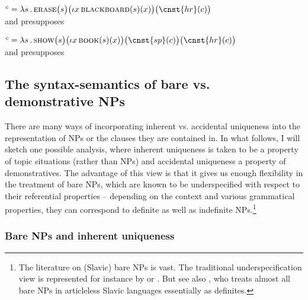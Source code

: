 \documentclass[output=paper,colorlinks,citecolor=brown,newtxmath]{langscibook}
\begin{document}
\ea {}$^c=\lambda s\,.\,\textsc{erase}\big(s\big)\big(\iota x\,\textsc{blackboard}(s)(x)\big)\big(\cnst{hr}(c)\big)$\\
and presupposes   \label{simik:ex:blackboard-tc}
\z

\ea {}$^c=\lambda s\,.\,\textsc{show}\big(s\big)\big(\iota x\,\textsc{book}(s)(x)\big)\big(\cnst{sp}(c)\big)\big(\cnst{hr}(c)\big)$\\\label{simik:ex:kramsky-tc}
and presupposes 
\z



\subsection{The syntax-semantics of bare vs. demonstrative NPs}

There are many ways of incorporating inherent vs. accidental uniqueness into the representation of NPs or the clauses they are contained in. In what follows, I will sketch one possible analysis, where inherent uniqueness is taken to be a property of topic situations (rather than NPs) and accidental uniqueness a property of demonstratives. The advantage of this view is that it gives us enough flexibility in the treatment of bare NPs, which are known to be underspecified with respect to their referential properties -- depending on the context and various grammatical properties, they can correspond to definite as well as indefinite NPs.\footnote{The literature on (Slavic) bare NPs is vast. The traditional underspecification view is represented for instance by \citet{Chierchia1998} or \citet{Geist2010}. But see also \citet{Dayal2004,Dayal2011}, who treats almost all bare NPs in articleless Slavic languages essentially as definites.}

\subsubsection{Bare NPs and inherent uniqueness}\label{simik:sec:bare-nps-inherent}
\end{document}
